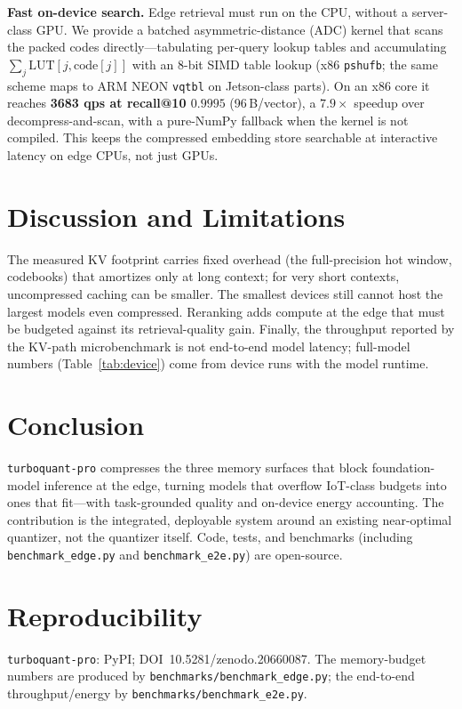 \documentclass[10pt,conference,compsoc]{IEEEtran}
\begin{document}
\textbf{Fast on-device search.} Edge retrieval must run on the CPU, without a
server-class GPU. We provide a batched asymmetric-distance (ADC) kernel that scans
the packed codes directly---tabulating per-query lookup tables and accumulating
$\sum_j \mathrm{LUT}[j,\mathrm{code}[j]]$ with an 8-bit SIMD table lookup (x86
\texttt{pshufb}; the same scheme maps to ARM NEON \texttt{vqtbl} on Jetson-class
parts). On an x86 core it reaches \textbf{3683 qps at recall@10 $0.9995$}
(96\,B/vector), a $7.9\times$ speedup over decompress-and-scan, with a pure-NumPy
fallback when the kernel is not compiled. This keeps the compressed embedding store
searchable at interactive latency on edge CPUs, not just GPUs.

\section{Discussion and Limitations}
The measured KV footprint carries fixed overhead (the full-precision hot window,
codebooks) that amortizes only at long context; for very short contexts,
uncompressed caching can be smaller. The smallest devices still cannot host the
largest models even compressed. Reranking adds compute at the edge that must be
budgeted against its retrieval-quality gain. Finally, the throughput reported by
the KV-path microbenchmark is not end-to-end model latency; full-model numbers
(Table~\ref{tab:device}) come from device runs with the model runtime.

\section{Conclusion}
\texttt{turboquant-pro} compresses the three memory surfaces that block
foundation-model inference at the edge, turning models that overflow IoT-class
budgets into ones that fit---with task-grounded quality and on-device energy
accounting. The contribution is the integrated, deployable system around an
existing near-optimal quantizer, not the quantizer itself. Code, tests, and
benchmarks (including \texttt{benchmark\_edge.py} and \texttt{benchmark\_e2e.py})
are open-source.

\section*{Reproducibility}
\texttt{turboquant-pro}: PyPI; DOI~10.5281/zenodo.20660087. The memory-budget
numbers are produced by \texttt{benchmarks/benchmark\_edge.py}; the end-to-end
throughput/energy by \texttt{benchmarks/benchmark\_e2e.py}.
\end{document}
